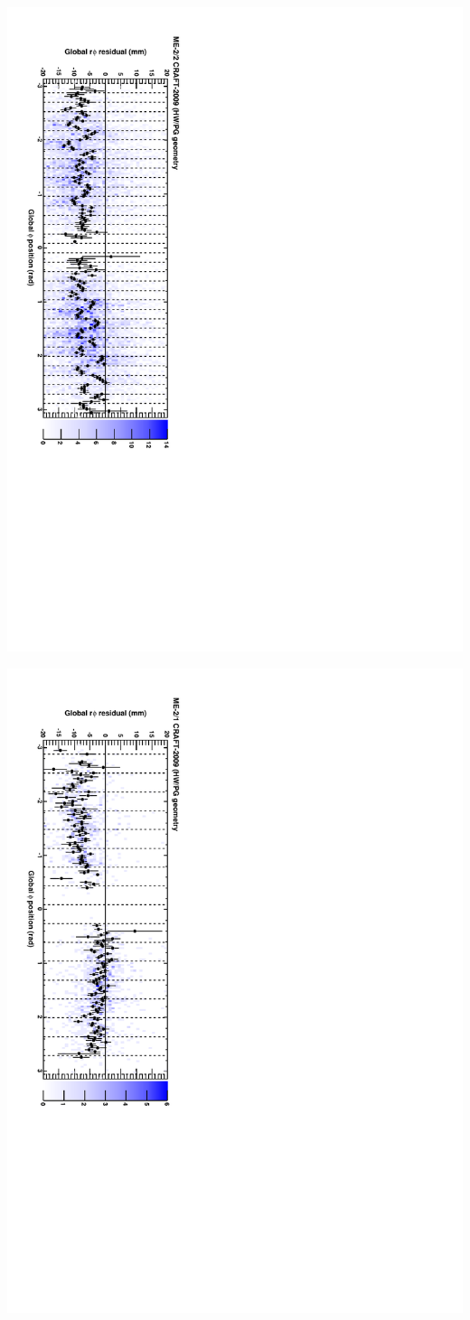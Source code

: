 \documentclass[compress]{beamer}
\begin{document}
\begin{frame}
\vspace{1 cm}
\includegraphics[height=\linewidth, angle=90]{series03.pdf}

\includegraphics[height=\linewidth, angle=90]{series04.pdf}
\end{frame}
\end{document}
